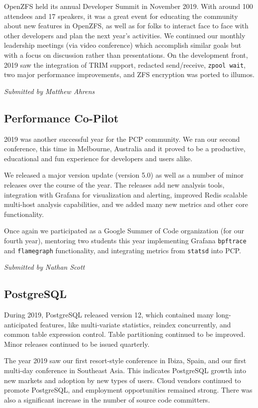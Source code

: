 \documentclass[a4paper]{report}
\begin{document}
OpenZFS held its annual Developer Summit in November 2019. With around
100 attendees and 17 speakers, it was a great event for educating the
community about new features in OpenZFS, as well as for folks to
interact face to face with other developers and plan the next year's
activities. We continued our monthly leadership meetings (via video
conference) which accomplish similar goals but with a focus on
discussion rather than presentations. On the development front, 2019 saw
the integration of TRIM support, redacted send/receive, \texttt{zpool
wait}, two major performance improvements, and ZFS encryption was ported
to illumos.

{\em Submitted by Matthew Ahrens}

\subsection{Performance Co-Pilot}

2019 was another successful year for the PCP community.  We ran our
second conference, this time in Melbourne, Australia and it proved to be
a productive, educational and fun experience for developers and users
alike.

We released a major version update (version 5.0) as well as a number of
minor releases over the course of the year.  The releases add new
analysis tools, integration with Grafana for visualization and alerting,
improved Redis scalable multi-host analysis capabilities, and we added
many new metrics and other core functionality.

Once again we participated as a Google Summer of Code organization (for
our fourth year), mentoring two students this year implementing Grafana
\texttt{bpftrace} and \texttt{flamegraph} functionality, and integrating
metrics from \texttt{statsd} into PCP.

{\em Submitted by Nathan Scott}

\subsection{PostgreSQL}

During 2019, PostgreSQL released version 12, which contained many
long-anticipated features, like multi-variate statistics, reindex
concurrently, and common table expression control.  Table partitioning
continued to be improved.  Minor releases continued to be issued
quarterly.

The year 2019 saw our first resort-style conference in Ibiza, Spain, and
our first multi-day conference in Southeast Asia.  This indicates
PostgreSQL growth into new markets and adoption by new types of users.
Cloud vendors continued to promote PostgreSQL, and employment
opportunities remained strong.  There was also a significant increase in
the number of source code committers.
\end{document}
